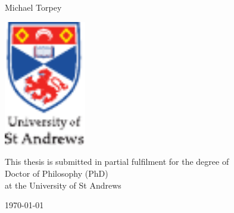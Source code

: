 \begin{titlepage}
  \centering

  \null
  \vspace{2em}

  {\Huge \textbf{\printtitle} \par}
  \vspace{7em}

  {\huge Michael Torpey}
  \vspace{6em}

  \includegraphics[height=14.8em,keepaspectratio,clip=true]{pics/arms}
  \vspace{6em}

  {\large \doublespacing
    This thesis is submitted in partial fulfilment for the degree of\\
    Doctor of Philosophy (PhD)\\
    at the University of St Andrews \par}
  \vspace{7em}

  \UKvardate
  {\Large \today}
\end{titlepage}
